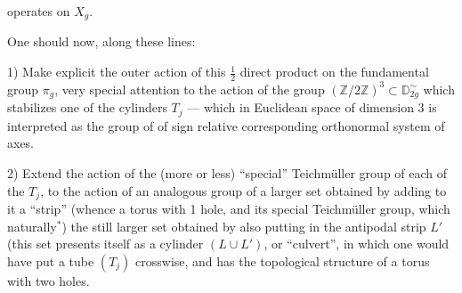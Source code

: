 
operates on $X_g$.

One should now, along these lines:

1) Make explicit the outer action of this $\frac12$ direct product on the fundamental group $\pi_g$,  very special attention to the action of the group $(\mathbb Z/2\mathbb Z)^3\subset\mathbb D_{2g}^{\sim}$ which stabilizes one of the cylinders $T_j$ --- which in Euclidean space of dimension 3 is interpreted as the group of  of sign relative  corresponding orthonormal system of axes.

2) Extend the action  of the (more or less) ``special'' Teichmüller group of each of the $T_j$, to the action of an analogous group of a larger set obtained by adding to it a ``strip''  (whence a torus with 1 hole, and its special Teichmüller group, which  naturally$^*$)  the still larger set obtained by also putting in the antipodal strip $L'$ (this set presents itself as a cylinder $(L\cup L')$, or ``culvert'', in which one would have put a tube $(T_j)$ crosswise, and has the topological structure of a torus with two holes.

